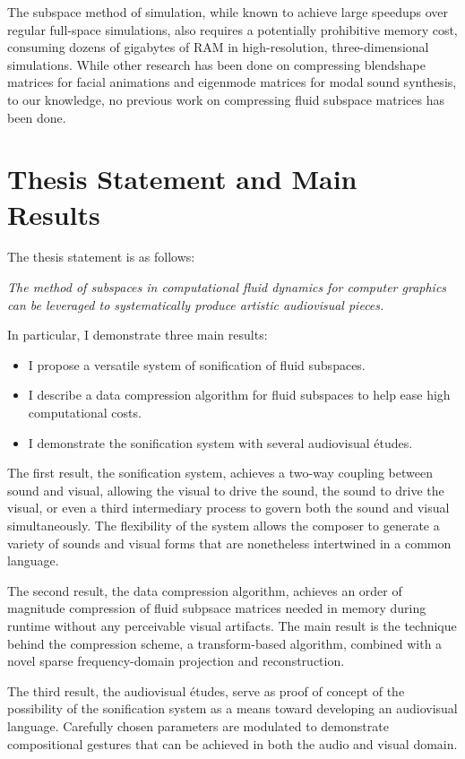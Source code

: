 The subspace method of simulation, while known to achieve large speedups over regular full-space simulations, also requires a potentially prohibitive memory cost, consuming dozens of gigabytes of RAM 
in high-resolution, three-dimensional simulations. While other research has been done on compressing blendshape matrices for facial animations and eigenmode matrices for modal sound synthesis,
to our knowledge, no previous work on compressing fluid subspace matrices has been done.

\section{Thesis Statement and Main Results}
The thesis statement is as follows:

\begin{addmargin}[1em]{2em}
{\em The method of subspaces in computational fluid dynamics for computer graphics can be leveraged to systematically produce artistic audiovisual pieces.}
\end{addmargin}
In particular, I demonstrate three main results:

\begin{itemize}
	\item I propose a versatile system of sonification of fluid subspaces.
	\item I describe a data compression algorithm for fluid subspaces to help ease high computational costs.
	\item I demonstrate the sonification system with several audiovisual {\'e}tudes.
\end{itemize}

The first result, the sonification system, achieves a two-way coupling between sound and visual, allowing the visual to drive the sound, the sound to drive the visual, or even a third intermediary process to govern both the sound and visual simultaneously. The flexibility of the system allows the composer to generate a variety of sounds and visual forms that are nonetheless intertwined in a common language. 

The second result, the data compression algorithm, achieves an order of magnitude compression of fluid subpsace matrices needed in memory during runtime without any perceivable visual artifacts. The main result is the technique behind the compression scheme, a transform-based algorithm, combined with a novel sparse frequency-domain projection and reconstruction.

The third result, the audiovisual {\'e}tudes, serve as proof of concept of the possibility of the sonification system as a means toward developing an audiovisual language. Carefully chosen parameters are modulated to demonstrate compositional gestures that can be achieved in both the audio and visual domain. 

